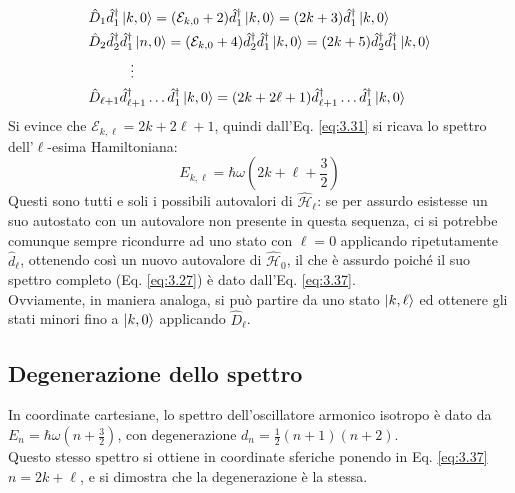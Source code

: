 \begin{equation*}
	\begin{split}
		&\hat{D}_1 \hat{d}_1^{\dagger} \ket{k,0} = (\mathcal{E}_{k,0} + 2) \hat{d}_1^{\dagger} \ket{k,0} = (2k + 3) \hat{d}_1^{\dagger} \ket{k,0}\\
		&\hat{D}_2 \hat{d}_2^{\dagger} \hat{d}_1^{\dagger} \ket{n,0} = (\mathcal{E}_{k,0} + 4) \hat{d}_2^{\dagger} \hat{d}_1^{\dagger} \ket{k,0} = (2k + 5) \hat{d}_2^{\dagger} \hat{d}_1^{\dagger} \ket{k,0}\\
		&\qquad\quad\vdots\\
		&\hat{D}_{\ell + 1} \hat{d}_{\ell + 1}^{\dagger} \dots \hat{d}_1^{\dagger} \ket{k,0} = (2k + 2\ell + 1) \hat{d}_{\ell + 1}^{\dagger} \dots \hat{d}_1^{\dagger} \ket{k,0}
	\end{split}
\end{equation*}
Si evince che $ \mathcal{E}_{k,\ell} = 2k + 2\ell + 1 $, quindi dall'Eq. \ref{eq:3.31} si ricava lo spettro dell'$ \ell $-esima Hamiltoniana:
\begin{equation}
	E_{k,\ell} = \hbar \omega \left( 2k + \ell + \frac{3}{2} \right)
	\label{eq:3.37}
\end{equation}
Questi sono tutti e soli i possibili autovalori di $ \hat{\mathcal{H}}_{\ell} $: se per assurdo esistesse un suo autostato con un autovalore non presente in questa sequenza, ci si potrebbe comunque sempre ricondurre ad uno stato con $ \ell = 0 $ applicando ripetutamente $ \hat{d}_{\ell} $, ottenendo così un nuovo autovalore di $ \hat{\mathcal{H}}_0 $, il che è assurdo poiché il suo spettro completo (Eq. \ref{eq:3.27}) è dato dall'Eq. \ref{eq:3.37}.\\
Ovviamente, in maniera analoga, si può partire da uno stato $ \ket{k,\ell} $ ed ottenere gli stati minori fino a $ \ket{k,0} $ applicando $ \hat{D}_{\ell} $.

\subsection{Degenerazione dello spettro}

In coordinate cartesiane, lo spettro dell'oscillatore armonico isotropo è dato da $ E_n = \hbar \omega \left( n + \frac{3}{2} \right) $, con degenerazione $ d_n = \frac{1}{2}(n + 1)(n + 2) $.\\
Questo stesso spettro si ottiene in coordinate sferiche ponendo in Eq. \ref{eq:3.37} $ n = 2k + \ell $, e si dimostra che la degenerazione è la stessa.


